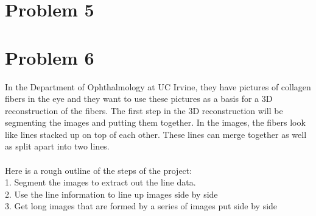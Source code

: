 \documentclass[11pt,psfig]{article}
\begin{document}
\newpage

\section*{Problem 5}

\newpage

\section*{Problem 6}

In the Department of Ophthalmology at UC Irvine, they have pictures of collagen fibers in the eye and they want to use these pictures as a basis for a 3D reconstruction of the fibers. The first step in the 3D reconstruction will be segmenting the images and putting them together. In the images, the fibers look like lines stacked up on top of each other. These lines can merge together as well as split apart into two lines. \\
\\
Here is a rough outline of the steps of the project: \\
1. Segment the images to extract out the line data. \\
2. Use the line information to line up images side by side \\
3. Get long images that are formed by a series of images put side by side \\
\end{document}
